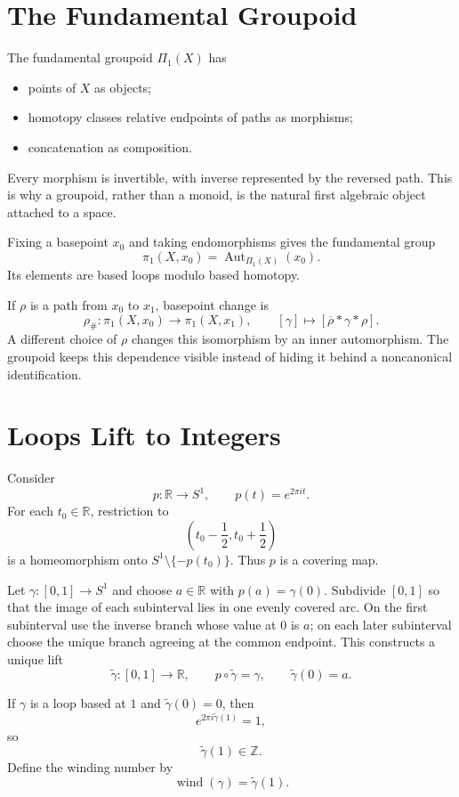 \section{The Fundamental Groupoid}

The fundamental groupoid \(\Pi_1(X)\) has
\begin{itemize}
  \item points of \(X\) as objects;
  \item homotopy classes relative endpoints of paths as morphisms;
  \item concatenation as composition.
\end{itemize}
Every morphism is invertible, with inverse represented by the reversed path.  This is why a groupoid, rather than a monoid, is the natural first algebraic object attached to a space.

Fixing a basepoint \(x_0\) and taking endomorphisms gives the fundamental group
\[
  \pi_1(X,x_0)
  =\operatorname{Aut}_{\Pi_1(X)}(x_0).
\]
Its elements are based loops modulo based homotopy.

If \(\rho\) is a path from \(x_0\) to \(x_1\), basepoint change is
\[
  \rho_\#:\pi_1(X,x_0)\to\pi_1(X,x_1),
  \qquad
  [\gamma]\longmapsto
  [\overline\rho*\gamma*\rho].
\]
A different choice of \(\rho\) changes this isomorphism by an inner automorphism.  The groupoid keeps this dependence visible instead of hiding it behind a noncanonical identification.

\section{Loops Lift to Integers}

Consider
\[
  p:\mathbb R\to S^1,
  \qquad
  p(t)=e^{2\pi i t}.
\]
For each \(t_0\in\mathbb R\), restriction to
\[
  \left(t_0-\frac12,t_0+\frac12\right)
\]
is a homeomorphism onto \(S^1\setminus\{-p(t_0)\}\).  Thus \(p\) is a covering map.

Let \(\gamma:[0,1]\to S^1\) and choose \(a\in\mathbb R\) with \(p(a)=\gamma(0)\).  Subdivide \([0,1]\) so that the image of each subinterval lies in one evenly covered arc.  On the first subinterval use the inverse branch whose value at \(0\) is \(a\); on each later subinterval choose the unique branch agreeing at the common endpoint.  This constructs a unique lift
\[
  \widetilde\gamma:[0,1]\to\mathbb R,
  \qquad
  p\circ\widetilde\gamma=\gamma,
  \qquad
  \widetilde\gamma(0)=a.
\]

If \(\gamma\) is a loop based at \(1\) and \(\widetilde\gamma(0)=0\), then
\[
  e^{2\pi i\widetilde\gamma(1)}=1,
\]
so
\[
  \widetilde\gamma(1)\in\mathbb Z.
\]
Define the winding number by
\[
  \operatorname{wind}(\gamma)=\widetilde\gamma(1).
\]


